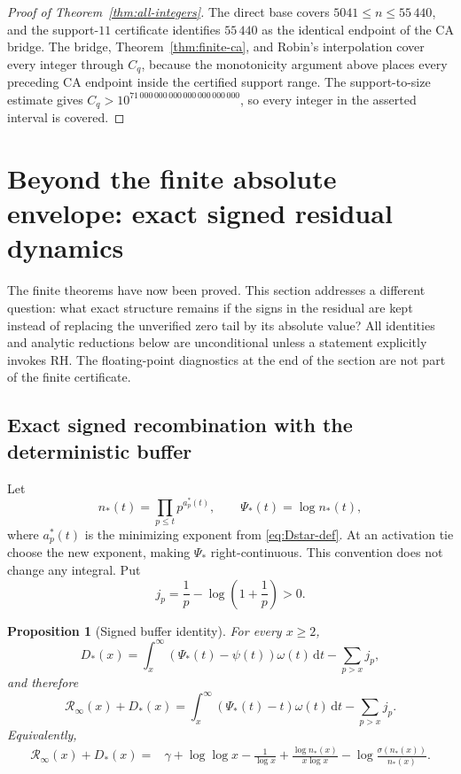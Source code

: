 \documentclass[11pt,a4paper]{article}
\numberwithin{equation}{section}
\newtheorem{proposition}[theorem]{Proposition}
\theoremstyle{definition}
\newcommand{\Kcut}{71\,000\,000\,000\,000\,000\,000\,000}
\newcommand{\dd}{\,\mathrm{d}}
\newcommand{\Rinf}{\mathcal R_{\infty}}
\begin{document}
\begin{proof}[Proof of Theorem~\ref{thm:all-integers}]
The direct base covers \(5041\le n\le55\,440\), and the support-\(11\)
certificate identifies \(55\,440\) as the identical endpoint of the CA
bridge.  The bridge, Theorem~\ref{thm:finite-ca}, and Robin's interpolation
cover every integer through \(C_q\), because the monotonicity argument above
places every preceding CA endpoint inside the certified support range.  The
support-to-size estimate gives \(C_q>10^{\Kcut}\), so every integer in the
asserted interval is
covered.
\end{proof}

\section{Beyond the finite absolute envelope: exact signed residual dynamics}
\label{sec:signed-dynamics}

The finite theorems have now been proved.  This section addresses a different
question: what exact structure remains if the signs in the residual are kept
instead of replacing the unverified zero tail by its absolute value?  All
identities and analytic reductions below are unconditional unless a statement
explicitly invokes RH.  The floating-point diagnostics at the end of the
section are not part of the finite certificate.

\subsection{Exact signed recombination with the deterministic buffer}

Let
\[
  n_*(t)=\prod_{p\le t}p^{a_p^*(t)},
  \qquad
  \Psi_*(t)=\log n_*(t),
\]
where \(a_p^*(t)\) is the minimizing exponent from
\eqref{eq:Dstar-def}.  At an activation tie choose the new exponent, making
\(\Psi_*\) right-continuous.  This convention does not change any integral.
Put
\[
  j_p=\frac1p-\log\left(1+\frac1p\right)>0.
\]

\begin{proposition}[Signed buffer identity]
\label{prop:signed-buffer}
For every \(x\ge2\),
\begin{equation}\label{eq:Dstar-signed-tail}
  \boxed{
  D_*(x)
  =\int_x^\infty(\Psi_*(t)-\psi(t))\omega(t)\dd t
  -\sum_{p>x}j_p,
  }
\end{equation}
and therefore
\begin{equation}\label{eq:Rinf-Dstar-signed-tail}
  \boxed{
  \Rinf(x)+D_*(x)
  =\int_x^\infty(\Psi_*(t)-t)\omega(t)\dd t
  -\sum_{p>x}j_p.
  }
\end{equation}
Equivalently,
\begin{align}
  \Rinf(x)+D_*(x)
  ={}&\gamma+\log\log x-\frac1{\log x}
  +\frac{\log n_*(x)}{x\log x}
  -\log\frac{\sigma(n_*(x))}{n_*(x)}.
  \label{eq:Rinf-Dstar-variational}
\end{align}
\end{proposition}
\end{document}

